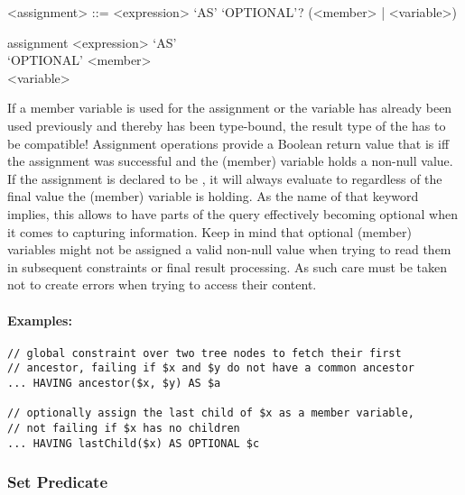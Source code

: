 \documentclass[11pt,a4paper]{article}
\begin{document}
\begin{gram}
	\label{gram:assignment}
	\begin{grammar}	
		<assignment> ::= <expression> `AS' `OPTIONAL'? (<member> | <variable>)
	\end{grammar}
	\diagsep
	
	\begin{rrdiag*}{assignment}
		<expression> `AS' \sst \\ `OPTIONAL' \est \sst <member> \\ <variable> \est
	\end{rrdiag*}
\end{gram}

If a member variable is used for the assignment or the variable has already been used previously and thereby has been type-bound, the result type of the  has to be compatible!
Assignment operations provide a Boolean return value that is  iff the assignment was successful and the (member) variable holds a non-null value.
If the assignment is declared to be , it will always evaluate to  regardless of the final value the (member) variable is holding.
As the name of that keyword implies, this allows to have parts of the query effectively becoming optional when it comes to capturing information.
Keep in mind that optional (member) variables might not be assigned a valid non-null value when trying to read them in subsequent constraints or final result processing.
As such care must be taken not to create errors when trying to access their content.

\paragraph{Examples:}
\begin{Verbatim}[samepage=true]
// global constraint over two tree nodes to fetch their first 
// ancestor, failing if $x and $y do not have a common ancestor
... HAVING ancestor($x, $y) AS $a

// optionally assign the last child of $x as a member variable,
// not failing if $x has no children
... HAVING lastChild($x) AS OPTIONAL $c
\end{Verbatim}


\subsubsection{Set Predicate}
\label{sec:set-predicate}
\end{document}
